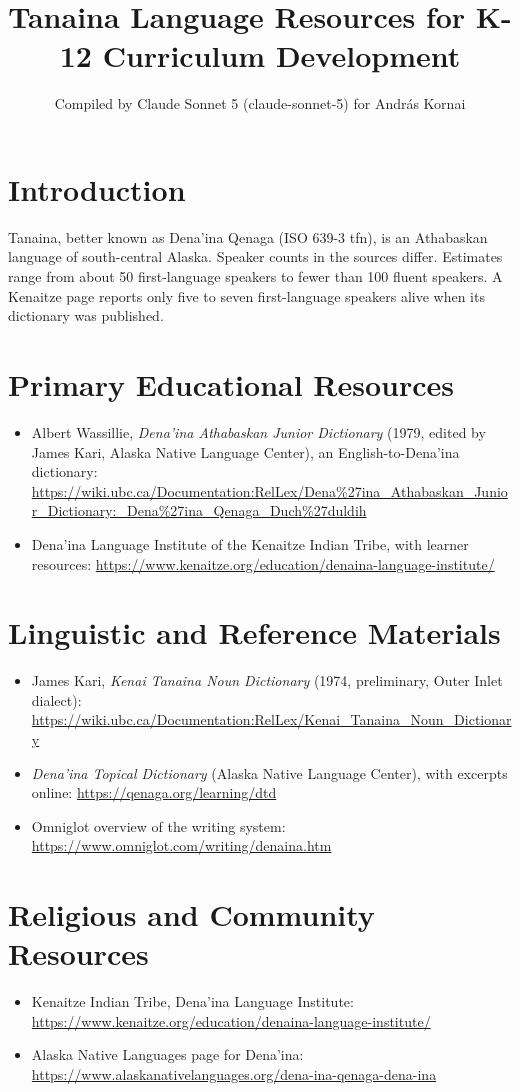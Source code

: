 \documentclass[12pt]{article}
\title{Tanaina Language Resources for K-12 Curriculum Development}
\author{Compiled by Claude Sonnet 5 (claude-sonnet-5) for Andr\'as Kornai}
\date{}
\begin{document}
\maketitle
\section{Introduction}
Tanaina, better known as Dena'ina Qenaga (ISO 639-3 tfn), is an Athabaskan language of south-central Alaska. Speaker counts in the sources differ. Estimates range from about 50 first-language speakers to fewer than 100 fluent speakers. A Kenaitze page reports only five to seven first-language speakers alive when its dictionary was published.
\section{Primary Educational Resources}
\begin{itemize}
\item Albert Wassillie, \emph{Dena'ina Athabaskan Junior Dictionary} (1979, edited by James Kari, Alaska Native Language Center), an English-to-Dena'ina dictionary: \url{https://wiki.ubc.ca/Documentation:RelLex/Dena%27ina_Athabaskan_Junior_Dictionary:_Dena%27ina_Qenaga_Duch%27duldih}
\item Dena'ina Language Institute of the Kenaitze Indian Tribe, with learner resources: \url{https://www.kenaitze.org/education/denaina-language-institute/}
\end{itemize}
\section{Linguistic and Reference Materials}
\begin{itemize}
\item James Kari, \emph{Kenai Tanaina Noun Dictionary} (1974, preliminary, Outer Inlet dialect): \url{https://wiki.ubc.ca/Documentation:RelLex/Kenai_Tanaina_Noun_Dictionary}
\item \emph{Dena'ina Topical Dictionary} (Alaska Native Language Center), with excerpts online: \url{https://qenaga.org/learning/dtd}
\item Omniglot overview of the writing system: \url{https://www.omniglot.com/writing/denaina.htm}
\end{itemize}
\section{Religious and Community Resources}
\begin{itemize}
\item Kenaitze Indian Tribe, Dena'ina Language Institute: \url{https://www.kenaitze.org/education/denaina-language-institute/}
\item Alaska Native Languages page for Dena'ina: \url{https://www.alaskanativelanguages.org/dena-ina-qenaga-dena-ina}
\end{itemize}
\end{document}
